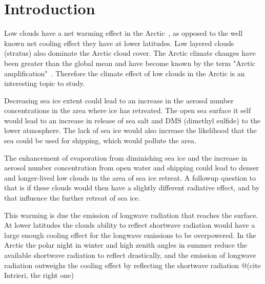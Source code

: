 \chapter{Introduction}
\label{chap:introduction}
Low clouds have a net warming effect in the Arctic~\citep{Intrieri2002a}, as opposed to the well known net cooling effect they have at lower latitudes. Low layered clouds (stratus) also dominate the Arctic cloud cover. The Arctic climate changes have been greater than the global mean and have become known by the term "Arctic amplification"~\citep{Graversen2008}. Therefore the climate effect of low clouds in the Arctic is an interesting topic to study.

Decreasing sea ice extent could lead to an increase in the aerosol number concentrations in the area where ice has retreated. The open sea surface it self would lead to an increase in release of sea salt and DMS (dimethyl sulfide) to the lower atmosphere. The lack of sea ice would also increase the likelihood that the sea could be used for shipping, which would pollute the area.

The enhancement of evaporation from diminishing sea ice and the increase in aerosol number concentration from open water and shipping could lead to denser and longer-lived low clouds in the area of sea ice retreat. A followup question to that is if these clouds would then have a slightly different radiative effect, and by that influence the further retreat of sea ice.


This warming is due the emission of longwave radiation that reaches the surface. At lower latitudes the clouds ability to reflect shortwave radiation would have a large enough cooling effect for the longwave emissions to be overpowered. In the Arctic the polar night in winter and high zenith angles in summer reduce the available shortwave radiation to reflect drastically, and the emission of longwave radiation outweighs the cooling effect by reflecting the shortwave radiation @(cite Intrieri, the right one)
 


